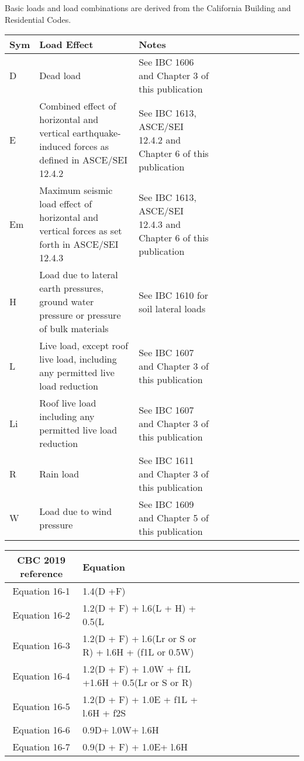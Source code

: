 \documentclass[12pt,notitle,letterpaper]{report}
\begin{document}
Basic loads and load combinations are derived from the California Building
and Residential Codes.

 \begin{tabulary}{1.0\textwidth}{leftleftleft}
\hline
 Sym   & Load Effect               & Notes   \\
\hline
 D     & Dead load                 & See IBC 1606 and Chapter 3 of
this publication         \\
 E     & Combined effect of horizontal
and vertical earthquake-
induced forces as defined in
ASCE/SEI 12.4.2                           & See IBC 1613, ASCE/SEI 12.4.2
and Chapter 6 of this
publication         \\
 Em    & Maximum seismic load effect of
horizontal and vertical forces
as set forth in ASCE/SEI
12.4.3                           & See IBC 1613, ASCE/SEI 12.4.3
and Chapter 6 of this
publication         \\
 H     & Load due to lateral earth
pressures, ground water
pressure or pressure of bulk
materials                           & See IBC 1610 for soil lateral
loads         \\
 L     & Live load, except roof live
load, including any permitted
live load reduction                           & See IBC 1607 and Chapter 3 of
this publication         \\
 Li    & Roof live load including any
permitted live load reduction                           & See IBC 1607 and Chapter 3 of
this publication         \\
 R     & Rain load                 & See IBC 1611 and Chapter 3 of
this publication         \\
 W     & Load due to wind pressure & See IBC 1609 and Chapter 5 of
this publication         \\
\hline
\end{tabulary}
\vspace{.15in}

 \begin{tabulary}{1.0\textwidth}{centercenter}
\hline
  CBC 2019 reference  &                        Equation                       \\
\hline
    Equation 16-1     &                       1.4(D +F)                       \\
    Equation 16-2     &            1.2(D + F) + l.6(L + H) + 0.5(L            \\
    Equation 16-3     & 1.2(D + F) + l.6(Lr or S or R) + l.6H + (f1L or 0.5W) \\
    Equation 16-4     &   1.2(D + F) + 1.0W + f1L +1.6H + 0.5(Lr or S or R)   \\
    Equation 16-5     &         1.2(D + F) + 1.0E + f1L + l.6H + f2S          \\
    Equation 16-6     &                   0.9D+ l.0W+ l.6H                    \\
    Equation 16-7     &                0.9(D + F) + 1.0E+ l.6H                \\
\hline
\end{tabulary}
\vspace{.15in}
\end{document}
